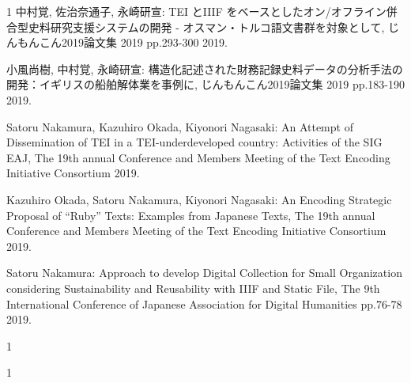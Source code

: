 \begin{査読付}{1}
中村覚, 佐治奈通子, 永崎研宣:
 TEI とIIIF をベースとしたオン/オフライン併合型史料研究支援システムの開発 - オスマン・トルコ語文書群を対象として,  じんもんこん2019論文集 2019 pp.293-300 2019.

小風尚樹, 中村覚, 永崎研宣:
 構造化記述された財務記録史料データの分析手法の開発：イギリスの船舶解体業を事例に,  じんもんこん2019論文集 2019 pp.183-190 2019.

Satoru Nakamura, Kazuhiro Okada, Kiyonori Nagasaki:
 An Attempt of Dissemination of TEI in a TEI-underdeveloped country: Activities of the SIG EAJ,  The 19th annual Conference and Members Meeting of the Text Encoding Initiative Consortium 2019.

Kazuhiro Okada, Satoru Nakamura, Kiyonori Nagasaki:
 An Encoding Strategic Proposal of “Ruby” Texts: Examples from Japanese Texts,  The 19th annual Conference and Members Meeting of the Text Encoding Initiative Consortium 2019.

Satoru Nakamura:
 Approach to develop Digital Collection for Small Organization considering Sustainability and Reusability with IIIF and Static File,  The 9th International Conference of Japanese Association for Digital Humanities pp.76-78 2019.

\end{査読付}

\begin{公開}{1}

\end{公開}

\begin{特許}{1}


\end{特許}

